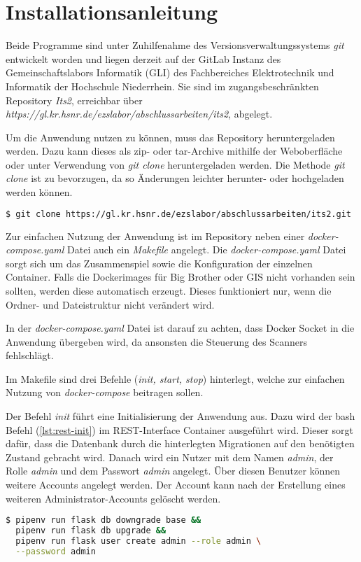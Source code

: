 \section{Installationsanleitung}
Beide Programme sind unter Zuhilfenahme des Versionsverwaltungssystems \textit{git} entwickelt worden und liegen derzeit auf der GitLab Instanz des Gemeinschaftslabors Informatik (GLI) des Fachbereiches Elektrotechnik und Informatik der Hochschule Niederrhein. Sie sind im zugangsbeschränkten Repository \textit{Its2}, erreichbar über\\ \textit{https://gl.kr.hsnr.de/ezslabor/abschlussarbeiten/its2}, abgelegt.

Um die Anwendung nutzen zu können, muss das Repository heruntergeladen werden.
Dazu kann dieses als zip- oder tar-Archive mithilfe der Weboberfläche oder unter Verwendung von \textit{git clone} heruntergeladen werden. Die Methode \textit{git clone} ist zu bevorzugen, da so Änderungen leichter herunter- oder hochgeladen werden können.

\begin{lstlisting}[language=bash, caption={git clone (bash)}, captionpos=b, label={lst:git-clone}]
$ git clone https://gl.kr.hsnr.de/ezslabor/abschlussarbeiten/its2.git
\end{lstlisting}

Zur einfachen Nutzung der Anwendung ist im Repository neben einer \textit{docker-compose.yaml} Datei auch ein \textit{Makefile} angelegt. Die \textit{docker-compose.yaml} Datei sorgt sich um das Zusammenspiel sowie die Konfiguration der einzelnen Container. Falls die Dockerimages für Big Brother oder GIS nicht vorhanden sein sollten, werden diese automatisch erzeugt. Dieses funktioniert nur, wenn die Ordner- und Dateistruktur nicht verändert wird.

In der \textit{docker-compose.yaml} Datei ist darauf zu achten, dass Docker Socket in die Anwendung übergeben wird, da ansonsten die Steuerung des Scanners fehlschlägt.

Im Makefile sind drei Befehle (\textit{init, start, stop}) hinterlegt, welche zur einfachen Nutzung von \textit{docker-compose} beitragen sollen.

Der Befehl \textit{init} führt eine Initialisierung der Anwendung aus. Dazu wird der bash Befehl (\ref{lst:rest-init}) im REST-Interface Container ausgeführt wird.
Dieser sorgt dafür, dass die Datenbank durch die hinterlegten Migrationen auf den benötigten Zustand gebracht wird. Danach wird ein Nutzer mit dem Namen \textit{admin}, der Rolle \textit{admin} und dem Passwort \textit{admin} angelegt. Über diesen Benutzer können weitere Accounts angelegt werden. Der Account kann nach der Erstellung eines weiteren Administrator-Accounts gelöscht werden.
\begin{lstlisting}[language=bash, caption={Initalisierung REST-Interface (bash)}, captionpos=b, label={lst:rest-init}]
$ pipenv run flask db downgrade base && 
  pipenv run flask db upgrade && 
  pipenv run flask user create admin --role admin \
  --password admin
\end{lstlisting}

